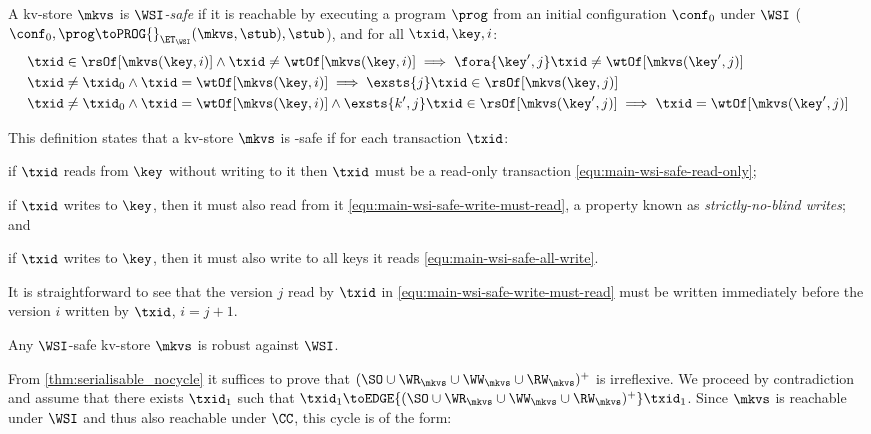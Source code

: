 \begin{definition}
\label{def:main-body-wsi-safe}
    A kv-store \( \mkvs \) is \emph{\(\WSI\)-safe} if it is 
    reachable by executing a program \( \prog \) from an initial configuration \( \conf_0 \) under $\WSI$
   (\ie \( \conf_0, \prog \toPROG{}_{\ET_\WSI} (\mkvs, \stub), \stub\)), and for all $\txid, \key, i$:
   {\displaymathfont
    \begin{align}
         & \txid \in \rsOf[\mkvs(\key,i)] \land \txid \neq \wtOf[\mkvs(\key,i)]  \implies \fora{\key',j} \txid \neq \wtOf[\mkvs(\key',j)] \label{equ:main-wsi-safe-read-only} \\
         & \txid \neq \txid_0 \land \txid = \wtOf[\mkvs(\key,i)] \implies \exsts{j} \txid \in \rsOf[\mkvs(\key,j)] \label{equ:main-wsi-safe-write-must-read} \\
         & \txid \neq \txid_0 \land \txid = \wtOf[\mkvs(\key,i)] \land \exsts{k', j} \txid \in \rsOf[\mkvs(\key',j)] \implies \txid = \wtOf[\mkvs(\key',j)] \label{equ:main-wsi-safe-all-write}
    \end{align}
    \normalsize
    }
\end{definition}

This definition states that a kv-store $\mkvs$ is \WSI-safe if for each transaction $\txid$: 
\begin{enumerate*} 
    \item if $\txid$ reads from $\key$ without writing to it then $\txid$ must be a read-only transaction \eqref{equ:main-wsi-safe-read-only}; 
    \item if \( \txid \) writes to $\key$, then it must also read from it \eqref{equ:main-wsi-safe-write-must-read}, a property known as \emph{strictly-no-blind writes}; and
	\item  if \( \txid \) writes to $\key$, then it must also write to all keys it reads \eqref{equ:main-wsi-safe-all-write}.
\end{enumerate*}
It is straightforward to see that the version $j$ read by \( \txid \) in \eqref{equ:main-wsi-safe-write-must-read} must be written immediately before the version $i$ written by \( \txid \), \ie \( i {=} j + 1 \).

\begin{theorem}
 \label{thm:main-wsi-robust}
    Any \(\WSI\)-safe kv-store \( \mkvs \) is robust against \(\WSI\).   
\end{theorem}

\noindent From \cref{thm:serialisable_nocycle} it suffices to prove that $(\SO \cup \WR_{\mkvs} \cup \WW_{\mkvs} \cup \RW_{\mkvs})^{+}$ is irreflexive.
We proceed by contradiction and assume that there exists $\txid_1$ such that $\txid_1 \toEDGE{(\SO \cup \WR_{\mkvs} \cup \WW_{\mkvs} \cup \RW_{\mkvs})^{+}} \txid_1$. 
Since \( \mkvs \) is reachable under \( \WSI \) and thus also reachable under \( \CC \),
this cycle is of the form:

